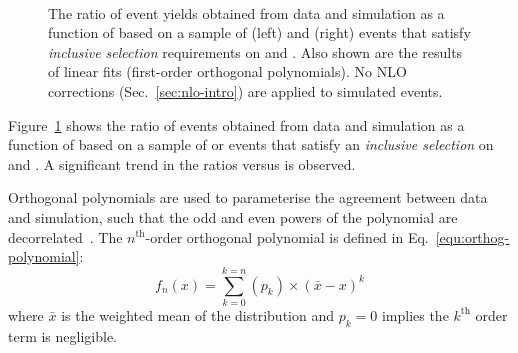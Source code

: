 \begin{figure}[h!]
  \centering
  ~
  \\
  \caption{\label{fig:linearMotiv} The ratio of event yields obtained
    from data and simulation as a function of \mht [GeV] based on a
    sample of (left) \mj and (right) \mmj events that satisfy {\it
      inclusive selection} requirements on \njet and \scalht. Also
    shown are the results of linear fits (\ie first-order orthogonal
    polynomials). No NLO corrections (Sec.~\ref{sec:nlo-intro}) are
    applied to simulated events.}
\end{figure}

Figure~\ref{fig:linearMotiv} shows the ratio of events obtained from
data and simulation as a function of \mht based on a sample of \mj or
\mmj events that satisfy an {\it inclusive selection} on \njet and
\scalht. A significant trend in the ratios versus \HTmiss is observed.

Orthogonal polynomials are used to parameterise the agreement between
data and simulation, such that the odd and even powers of the
polynomial are decorrelated~\cite{cohen2013applied}. The
$n^\textrm{th}$-order orthogonal polynomial is defined in
Eq.~\ref{equ:orthog-polynomial}:
\begin{equation}
  \label{equ:orthog-polynomial}
  f_n(x) = \sum_{k=0}^{k=n}{(p_k)\times(\bar{x}-x)^k}
\end{equation}
where $\bar{x}$ is the weighted mean of the distribution and $p_k = 0$
implies the $k^\textrm{th}$ order term is negligible.

